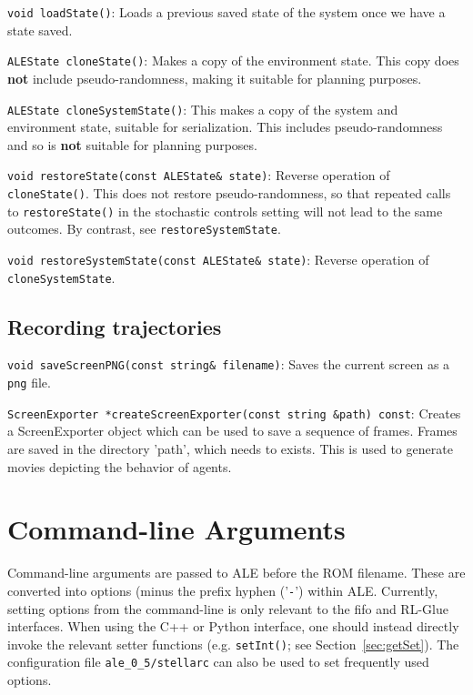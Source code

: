 \documentclass[12pt]{article}
\begin{document}
  \verb+void loadState()+: Loads a previous saved state of the system once we have a state saved.

  \verb+ALEState cloneState()+: Makes a copy of the environment state. This copy does \textbf{not}
  include pseudo-randomness, making it suitable for planning purposes.

  \verb+ALEState cloneSystemState()+:  This makes a copy of the system and environment state,
  suitable for serialization. This includes pseudo-randomness and so is \textbf{not} suitable for planning
  purposes.

  \verb+void restoreState(const ALEState& state)+:  Reverse operation of \verb+cloneState()+. This does not
  restore pseudo-randomness, so that repeated calls to \verb+restoreState()+ in the stochastic controls setting
  will not lead to the same outcomes. By contrast, see \verb+restoreSystemState+.

  \verb+void restoreSystemState(const ALEState& state)+: Reverse operation of \verb+cloneSystemState+.
  \subsection{Recording trajectories}
   
  \indent \indent \verb+void saveScreenPNG(const string& filename)+: Saves the current screen as
  a \verb+png+ file.
  
  \verb+ScreenExporter *createScreenExporter(const string &path) const+: Creates a 
  ScreenExporter object which can be used to save a sequence of frames. Frames are saved 
  in the directory 'path', which needs to exists. This is used to generate movies depicting the behavior
  of agents.
  
\section{Command-line Arguments}\label{sec:arguments}

Command-line arguments are passed to ALE before the ROM filename. These are converted into
options (minus the prefix hyphen ('\verb+-+') within ALE. Currently, 
setting options from the command-line is only relevant to the fifo and RL-Glue interfaces.
When using the C++ or Python interface, one should instead directly invoke the relevant setter
functions (e.g. \verb+setInt()+; see Section~\ref{sec:getSet}). The configuration file 
\verb+ale_0_5/stellarc+ can also be used to set frequently used options. 
\end{document}

